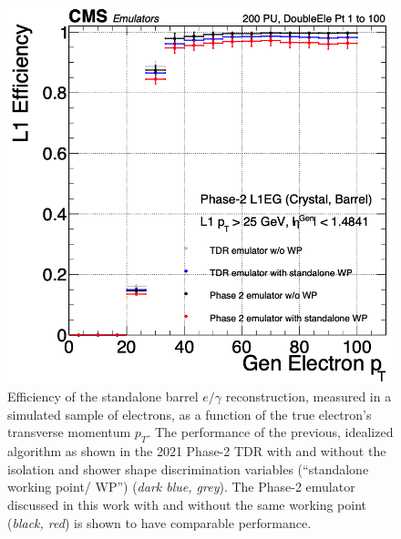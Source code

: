 \begin{figure}[ht]
    \centering
    \includegraphics[width=12cm]{figures/ch-3-phase2/results-egamma-efficiency-gt25.png}
    \caption[Efficiency of the standalone barrel $e/\gamma$ reconstruction, as a function of the true electron's transverse momentum $p_{T}$.]{Efficiency of the standalone barrel $e/\gamma$ reconstruction, measured in a simulated sample of electrons, as a function of the true electron's transverse momentum $p_{T}$. The performance of the previous, idealized algorithm as shown in the 2021 Phase-2 TDR \cite{CMS-TDR-021} with and without the isolation and shower shape discrimination variables (``standalone working point/ WP'') (\textit{dark blue, grey}). The Phase-2 emulator discussed in this work with and without the same working point (\textit{black, red}) is shown to have comparable performance.}
    \label{fig:results-egamma-efficiency-gt25}
\end{figure}

